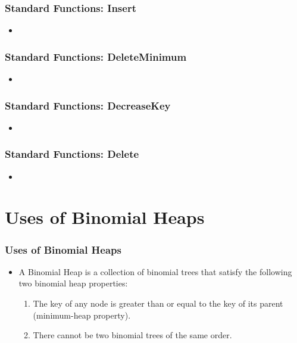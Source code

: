 \documentclass[13pt]{beamer}
\begin{document}
\begin{frame}
\frametitle{Standard Functions: Insert}
  \begin{itemize}
    \item
  \end{itemize}
\end{frame}


\begin{frame}
\frametitle{Standard Functions: DeleteMinimum}
  \begin{itemize}
    \item
  \end{itemize}
\end{frame}

\begin{frame}
\frametitle{Standard Functions: DecreaseKey}
  \begin{itemize}
    \item
  \end{itemize}
\end{frame}

\begin{frame}
\frametitle{Standard Functions: Delete}
  \begin{itemize}
    \item
  \end{itemize}
\end{frame}

\section{Uses of Binomial Heaps} %
\begin{frame}
\frametitle{Uses of Binomial Heaps}
  \begin{itemize}
    \item A \alert{Binomial Heap} is a collection of binomial trees that satisfy the following two binomial heap properties:
      \begin{enumerate}
        \item The key of any node is greater than or equal to the key of its parent (minimum-heap property).
        \item There cannot be two binomial trees of the same order.
      \end{enumerate}
  \end{itemize}
\end{frame}
\end{document}
